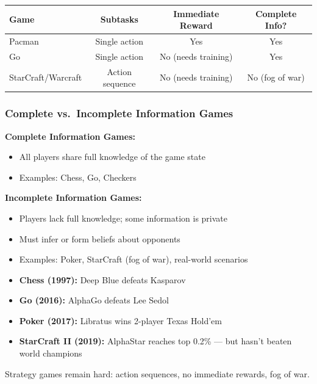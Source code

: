 \begin{center}
\renewcommand{\arraystretch}{1.3}
\begin{tabular}{@{} l c c c @{}}
\toprule
\textbf{Game} & \textbf{Subtasks} & \textbf{Immediate Reward} & \textbf{Complete Info?} \\
\midrule
Pacman & Single action & Yes & Yes \\
Go & Single action & No (needs training) & Yes \\
StarCraft/Warcraft & Action sequence & No (needs training) & No (fog of war) \\
\bottomrule
\end{tabular}
\end{center}

\bigseparator

\subsubsection{Complete vs.\ Incomplete Information Games}

\begin{defbox}
\textbf{Complete Information Games:}
\begin{itemize}
  \item All players share full knowledge of the game state
  \item Examples: Chess, Go, Checkers
\end{itemize}

\textbf{Incomplete Information Games:}
\begin{itemize}
  \item Players lack full knowledge; some information is private
  \item Must infer or form beliefs about opponents
  \item Examples: Poker, StarCraft (fog of war), real-world scenarios
\end{itemize}
\end{defbox}

\begin{tipbox}
\begin{itemize}
  \item \textbf{Chess (1997):} Deep Blue defeats Kasparov
  \item \textbf{Go (2016):} AlphaGo defeats Lee Sedol
  \item \textbf{Poker (2017):} Libratus wins 2-player Texas Hold'em
  \item \textbf{StarCraft II (2019):} AlphaStar reaches top 0.2\% --- but hasn't beaten world champions
\end{itemize}

Strategy games remain hard: action sequences, no immediate rewards, fog of war.
\end{tipbox}

